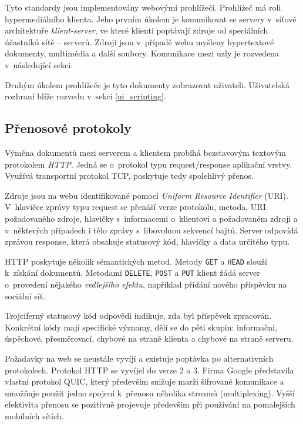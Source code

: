 Tyto standardy jsou implementovány webovými prohlížeči.
Prohlížeč má roli hypermediálního klienta.
Jeho prvním úkolem je komunikovat se servery v~síťové architektuře \emph{klient-server}, ve které klienti poptávají zdroje od speciálních účastníků sítě -- serverů.
Zdroji jsou v~případě webu myšleny hypertextové dokumenty, multimédia a další soubory.
Komunikace mezi uzly je rozvedena v~následující sekci.

Druhým úkolem prohlížeče je tyto dokumenty zobrazovat uživateli.
Uživatelská rozhraní blíže rozvedu v~sekci \ref{ui_scripting}.

\subsection{Přenosové protokoly}

Výměna dokumentů mezi serverem a klientem probíhá bezstavovým textovým protokolem \emph{HTTP}.
Jedná se o~protokol typu request/response aplikační vrstvy.
Využívá transportní protokol TCP, poskytuje tedy spolehlivý přenos.

Zdroje jsou na webu identifikované pomocí \emph{Uniform Resource Identifier} (URI).
V~hlavičce zprávy typu request se přenáší verze protokolu, metoda, URI požadovaného zdroje, hlavičky s~informacemi o~klientovi a požadovaném zdroji a v~některých případech i tělo zprávy s~libovolnou sekvencí bajtů.
Server odpovídá zprávou response, která obsahuje statusový kód, hlavičky a data určitého typu.
\cite{http-rfc}

HTTP poskytuje několik sémantických metod.
Metody \texttt{GET} a \texttt{HEAD} slouží k~získání dokumentů.
Metodami \texttt{DELETE}, \texttt{POST} a \texttt{PUT} klient žádá server o~provedení nějakého \emph{vedlejšího efektu}, například přidání nového příspěvku na sociální síť.

Trojciferný statusový kód odpovědi indikuje, zda byl příspěvek zpracován.
Konkrétní kódy mají specifické významy, dělí se do pěti skupin: informační, úspěchové, přesměrovací, chybové na straně klienta a chybové na straně serveru.

Požadavky na web se neustále vyvíjí a existuje poptávka po alternativních protokolech.
Protokol HTTP se vyvíjel do verze 2 a 3.
Firma Google představila vlastní protokol QUIC, který především snižuje marži šifrované komunikace a umožňuje použít jedno spojení k~přenosu několika streamů (multiplexing).
Vyšší efektivita přenosu se pozitivně projevuje především při používání na pomalejších mobilních sítích.

